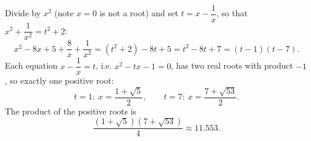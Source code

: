 Divide by $x^2$ (note $x=0$ is not a root) and set $t=x-\dfrac1x$, so that $x^2+\dfrac1{x^2}=t^2+2$:
\[x^2-8x+5+\dfrac8x+\dfrac1{x^2}=(t^2+2)-8t+5=t^2-8t+7=(t-1)(t-7).\]
Each equation $x-\dfrac1x=t$, i.e. $x^2-tx-1=0$, has two real roots with product $-1$, so exactly one positive root:
\[t=1:\ x=\dfrac{1+\sqrt5}2,\qquad t=7:\ x=\dfrac{7+\sqrt{53}}2.\]
The product of the positive roots is
\[\boxed{\dfrac{(1+\sqrt5)(7+\sqrt{53})}4}\approx11.553.\]
